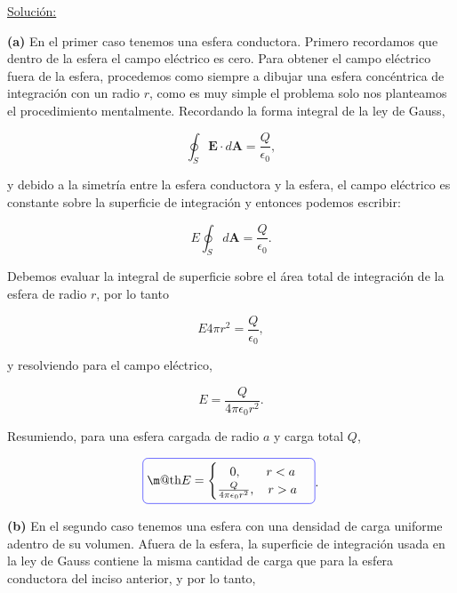 \documentclass[a4paper,11pt]{article}
\makeatletter
\numberwithin{equation}{section}
\newcommand*{\boxcolor}{blue}
\renewcommand{\boxed}[1]{\textcolor{\boxcolor}{%
\tikz[baseline={([yshift=-1ex]current bounding box.center)}] \node [rectangle, minimum width=1ex,rounded corners,draw] {\normalcolor\m@th$\displaystyle#1$};}}
\makeatother
\begin{document}
\vspace{.3cm}

\underline{Solución:} \vspace{.3cm}

\textbf{(a)} En el primer caso tenemos una esfera conductora. Primero recordamos que 
dentro de la esfera el campo eléctrico es cero. Para obtener el campo eléctrico 
fuera de la esfera, procedemos como siempre a dibujar una esfera concéntrica de 
integración con un radio $r$, como es muy simple el problema solo nos planteamos 
el procedimiento mentalmente. Recordando la forma integral de la ley de Gauss,

\begin{equation}
 \oint_S \mathbf{E} \cdot d\mathbf{A} = \frac{Q}{\epsilon_0},
\end{equation}

y debido a la simetría entre la esfera conductora y la esfera, el campo eléctrico es 
constante sobre la superficie de integración y entonces podemos escribir:

\begin{equation}
  E \oint_S  d\mathbf{A} = \frac{Q}{\epsilon_0}.
\end{equation}

Debemos evaluar la integral de superficie sobre el área total de integración 
de la esfera de radio $r$, por lo tanto 

\begin{equation}
 E4\pi r^2 = \frac{Q}{\epsilon_0},
\end{equation}

y resolviendo para el campo eléctrico, 

\begin{equation}
 E = \frac{Q}{4\pi \epsilon_0 r^2}.
\end{equation}

Resumiendo, para una esfera cargada de radio $a$ y carga total $Q$,

\begin{equation}
\boxed{
  E =\begin{cases}
	      \quad 0, \quad  \quad r < a \\
	      \frac{Q}{4\pi \epsilon_0 r^2}, \quad r > a
	       \end{cases}}.
\end{equation}

\textbf{(b)} En el segundo caso tenemos una esfera con una densidad de carga 
uniforme adentro de su volumen. Afuera de la esfera, la superficie de integración usada en la ley 
de Gauss contiene la misma cantidad de carga que para la esfera conductora 
del inciso anterior, y por lo tanto,
\end{document}
